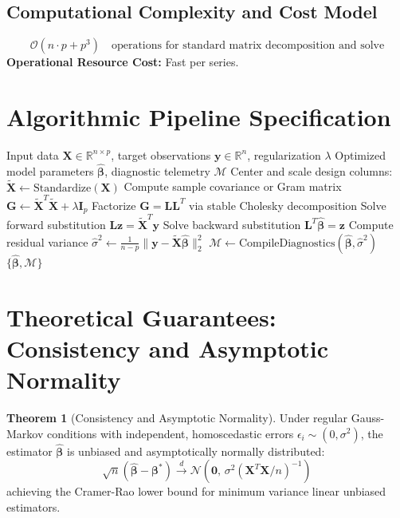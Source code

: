 \documentclass[11pt,a4paper]{article}
\theoremstyle{definition}
\newtheorem{theorem}{\textbf{Theorem}}[section]
\begin{document}
\subsection{Computational Complexity and Cost Model}
\begin{equation}
\mathcal{O}(n \cdot p + p^3) \quad \text{operations for standard matrix decomposition and solve}
\end{equation}
\textbf{Operational Resource Cost:} Fast per series.

\section{Algorithmic Pipeline Specification}

\begin{algorithm}[H]
\caption{ARIMA and seasonal ARIMA Execution}
\begin{algorithmic}[1]
\Require Input data $\mathbf{X} \in \mathbb{R}^{n \times p}$, target observations $\mathbf{y} \in \mathbb{R}^n$, regularization $\lambda$
\Ensure Optimized model parameters $\hat{\boldsymbol{\beta}}$, diagnostic telemetry $\mathcal{M}$
\State Center and scale design columns: $\tilde{\mathbf{X}} \gets \text{Standardize}(\mathbf{X})$
\State Compute sample covariance or Gram matrix $\mathbf{G} \gets \tilde{\mathbf{X}}^T \tilde{\mathbf{X}} + \lambda \mathbf{I}_p$
\State Factorize $\mathbf{G} = \mathbf{L} \mathbf{L}^T$ via stable Cholesky decomposition
\State Solve forward substitution $\mathbf{L} \mathbf{z} = \tilde{\mathbf{X}}^T \mathbf{y}$
\State Solve backward substitution $\mathbf{L}^T \hat{\boldsymbol{\beta}} = \mathbf{z}$
\State Compute residual variance $\hat{\sigma}^2 \gets \frac{1}{n - p} \| \mathbf{y} - \tilde{\mathbf{X}} \hat{\boldsymbol{\beta}} \|_2^2$
\State $\mathcal{M} \gets \text{CompileDiagnostics}(\hat{\boldsymbol{\beta}}, \hat{\sigma}^2)$
\State \Return $\{\hat{\boldsymbol{\beta}}, \mathcal{M}\}$
\end{algorithmic}
\end{algorithm}

\section{Theoretical Guarantees: Consistency and Asymptotic Normality}

\begin{theorem}[Consistency and Asymptotic Normality]
Under regular Gauss-Markov conditions with independent, homoscedastic errors $\epsilon_i \sim (0, \sigma^2)$, the estimator $\hat{\boldsymbol{\beta}}$ is unbiased and asymptotically normally distributed:
\begin{equation}
\sqrt{n}(\hat{\boldsymbol{\beta}} - \boldsymbol{\beta}^*) \xrightarrow{d} \mathcal{N}\left(\mathbf{0}, \, \sigma^2 (\mathbf{X}^T \mathbf{X} / n)^{-1}\right)
\end{equation}
achieving the Cramer-Rao lower bound for minimum variance linear unbiased estimators.
\end{theorem}
\end{document}
